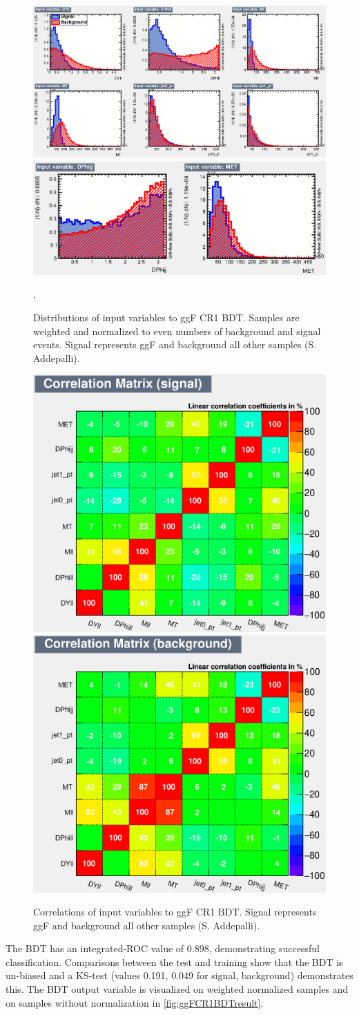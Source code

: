 \begin{figure}[!htbp]
    \centering
    \includegraphics[width=0.55\linewidth]{Pictures/ggFCR1/variables_id_c1.eps}
    \includegraphics[width=0.55\linewidth]{Pictures/ggFCR1/variables_id_c2.eps}
    \caption{Distributions of input variables to ggF CR1 BDT. Samples are weighted and normalized to even numbers of background and signal events. Signal represents ggF and background all other samples (S. Addepalli).}.
    \label{fig:ggFCR1BDTinput}
\end{figure}
\begin{figure}[!htbp]
\centering
  \includegraphics[width=.3\linewidth]{Pictures/ggFCR1/CorrelationMatrixS.eps}
  \includegraphics[width=.3\linewidth]{Pictures/ggFCR1/CorrelationMatrixB.eps}
\caption{Correlations of input variables to ggF CR1 BDT. Signal represents ggF and background all other samples (S. Addepalli).}
\label{fig:ggFCR1corrSB}
\end{figure}

The BDT has an integrated-ROC value of 0.898, demonstrating successful classification. Comparisons between the test and training show that the BDT is un-biased and a KS-test (values 0.191, 0.049 for signal, background) demonstrates this. The BDT output variable is visualized on weighted normalized samples and on samples without normalization in \ref{fig:ggFCR1BDTresult}.

